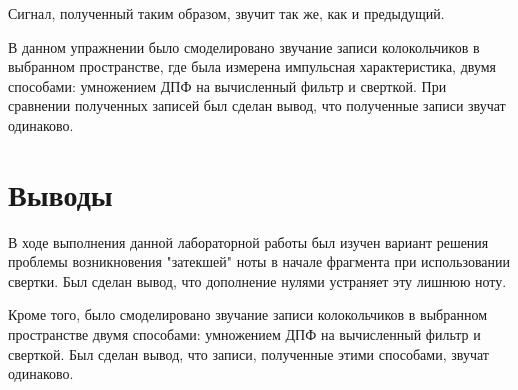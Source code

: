 \documentclass[a4paper, 14pt]{extarticle}
\begin{document}
    Сигнал, полученный таким образом, звучит так же, как и предыдущий.

    В данном упражнении было смоделировано звучание записи колокольчиков в выбранном пространстве, где была измерена
    импульсная характеристика, двумя способами: умножением ДПФ на вычисленный фильтр и сверткой.
    При сравнении полученных записей был сделан вывод, что полученные записи звучат одинаково.
    \newpage

    \section{Выводы}
    \label{sec:conclusions}

    В ходе выполнения данной лабораторной работы был изучен вариант решения проблемы возникновения "затекшей" ноты в
    начале фрагмента при использовании свертки. Был сделан вывод, что дополнение нулями устраняет эту лишнюю ноту.

    Кроме того, было смоделировано звучание записи колокольчиков в выбранном пространстве двумя способами:
    умножением ДПФ на вычисленный фильтр и сверткой. Был сделан вывод, что записи, полученные этими способами, звучат
    одинаково.
\end{document}

